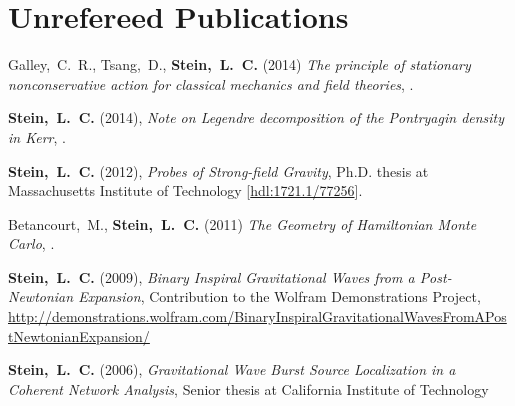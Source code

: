 \section{Unrefereed Publications}
\secstartswithlist{}%
\addtocounter{pubCounter}{-1}%
\begin{etaremune}[start=\value{pubCounter}]
\item
  Galley,~C.~R., Tsang,~D., {\bf Stein,~L.~C.}
  (2014)
  {\it The principle of stationary nonconservative action for
    classical mechanics and field theories},
  .
\item
  {\bf Stein,~L.~C.}
  (2014),
  {\it Note on Legendre decomposition of the Pontryagin density in Kerr},
  .
\item
  {\bf Stein,~L.~C.}
  (2012),
  {\it Probes of Strong-field Gravity}, Ph.D. thesis at Massachusetts
  Institute of Technology
  [\href{http://hdl.handle.net/1721.1/77256}{hdl:1721.1/77256}].
\item
  Betancourt,~M., {\bf Stein,~L.~C.}
  (2011)
  {\it The Geometry of Hamiltonian Monte Carlo},
  .
\item
  {\bf Stein,~L.~C.}
  (2009),
  {\it Binary Inspiral Gravitational Waves from a Post-Newtonian Expansion},
  Contribution to the Wolfram Demonstrations Project,
  \url{http://demonstrations.wolfram.com/BinaryInspiralGravitationalWavesFromAPostNewtonianExpansion/}
\item
  {\bf Stein,~L.~C.}
  (2006),
  {\it Gravitational Wave Burst Source Localization in a Coherent
    Network Analysis},
  Senior thesis at California Institute of Technology
\end{etaremune}


